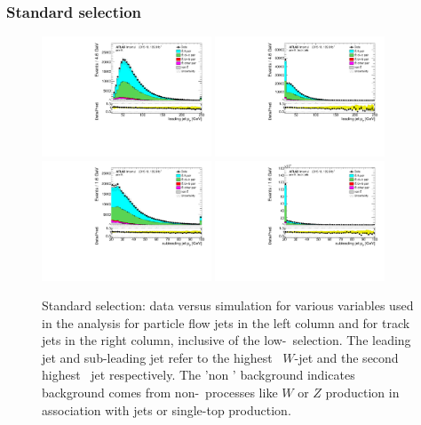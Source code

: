 \documentclass[letterpaper,12pt]{article}
\begin{document}
\subsubsection{Standard selection}
\label{standard selection}
\begin{figure}[H]
	\centering
	\includegraphics[width=0.45\textwidth]{figs_support/plots_withoutHighpT/DataMC_h_J0_pt.pdf}
	\includegraphics[width=0.45\textwidth]{figs_support/plots_withoutHighpT/DataMC_h_J0_pttrackjet.pdf}\\
	\includegraphics[width=0.45\textwidth]{figs_support/plots_withoutHighpT/DataMC_h_J1_pt.pdf}
	\includegraphics[width=0.45\textwidth]{figs_support/plots_withoutHighpT/DataMC_h_J1_pttrackjet.pdf}\\
	\caption{Standard selection: data versus simulation for various variables used in the analysis for 
	particle flow jets in the left column and for track jets in the right column, 
	inclusive of the low-\pt\ selection. 
	The leading jet and sub-leading jet refer to the highest \pt\ $W$-jet and the 
	second highest \pt\ jet respectively. The 'non \ttbar' background 
	indicates background comes from non-\ttbar\ processes like $W$ or $Z$ production
	in association with jets or single-top production. }
	\label{fig:kinematic_distributions_standard}
	\end{figure}
	
\end{document}
